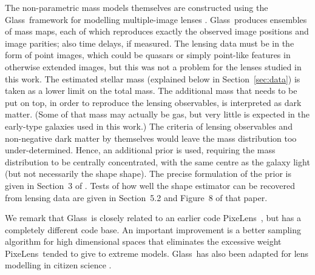 \documentclass[useAMS,usenatbib]{mn2e}
\def\Glass{{\sc Glass}}
\def\PixeLens{{\sc PixeLens}}
\begin{document}
The non-parametric mass models themselves are constructed using the
\Glass\ framework for modelling multiple-image lenses
\citep{2014MNRAS.445.2181C}.  \Glass\ produces ensembles of mass maps,
each of which reproduces exactly the observed image positions and
image parities; also time delays, if measured.  The lensing data must
be in the form of point images, which could be quasars or simply
point-like features in otherwise extended images, but this was not a
problem for the lenses studied in this work.  The estimated stellar
mass (explained below in Section~\ref{sec:data}) is taken as a lower
limit on the total mass.  The additional mass that needs to be put on
top, in order to reproduce the lensing observables, is interpreted as
dark matter.  (Some of that mass may actually be gas, but very little
is expected in the early-type galaxies used in this work.)  The
criteria of lensing observables and non-negative dark matter by
themselves would leave the mass distribution too under-determined.
Hence, an additional prior is used, requiring the mass distribution to
be centrally concentrated, with the same centre as the galaxy light
(but not necessarily the shape shape).  The precise formulation of the
prior is given in Section~3 of \cite{2014MNRAS.445.2181C}.  Tests of
how well the shape estimator can be recovered from lensing data are
given in Section~5.2 and Figure~8 of that paper.

We remark that \Glass\ is closely related to an earlier code
\PixeLens\ \citep{2004AJ....127.2604S,2008ApJ...679...17C}, but has a
completely different code base.  An important improvement is a better
sampling algorithm for high dimensional spaces
\citep{2012MNRAS.425.3077L} that eliminates the excessive weight
\PixeLens\ tended to give to extreme models. \Glass\ has also been
adapted for lens modelling in citizen science
\citep{2015MNRAS.447.2170K}.
\end{document}
